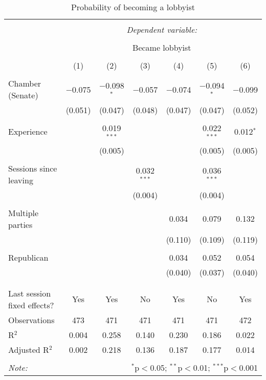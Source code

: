 \documentclass{article}
\begin{document}
  \begin{table}[!htbp] \centering 
    \caption{Probability of becoming a lobbyist} 
    \label{tab:lobbyist_basic} 
  \begin{tabular}{@{\extracolsep{5pt}}lcccccc} 
  \\[-1.8ex]\hline 
  \hline \\[-1.8ex] 
   & \multicolumn{6}{c}{\textit{Dependent variable:}} \\ 
  \cline{2-7} 
  \\[-1.8ex] & \multicolumn{6}{c}{Became lobbyist} \\ 
  \\[-1.8ex] & (1) & (2) & (3) & (4) & (5) & (6)\\ 
  \hline \\[-1.8ex] 
    Chamber (Senate) & $-$0.075 & $-$0.098$^{*}$ & $-$0.057 & $-$0.074 & $-$0.094$^{*}$ & $-$0.099 \\ 
    & (0.051) & (0.047) & (0.048) & (0.047) & (0.047) & (0.052) \\ 
    & & & & & & \\ 
   Experience &  & 0.019$^{***}$ &  &  & 0.022$^{***}$ & 0.012$^{*}$ \\ 
    &  & (0.005) &  &  & (0.005) & (0.005) \\ 
    & & & & & & \\ 
    Sessions since leaving &  &  & 0.032$^{***}$ &  & 0.036$^{***}$ &  \\ 
    &  &  & (0.004) &  & (0.004) &  \\ 
    & & & & & & \\ 
   Multiple parties &  &  &  & 0.034 & 0.079 & 0.132 \\ 
    &  &  &  & (0.110) & (0.109) & (0.119) \\ 
    & & & & & & \\ 
   Republican &  &  &  & 0.034 & 0.052 & 0.054 \\ 
    &  &  &  & (0.040) & (0.037) & (0.040) \\ 
    & & & & & & \\ 
  \hline \\[-1.8ex] 
  Last session fixed effects? & Yes & Yes & No & Yes & No & Yes \\ 
  Observations & 473 & 471 & 471 & 471 & 471 & 472 \\ 
  R$^{2}$ & 0.004 & 0.258 & 0.140 & 0.230 & 0.186 & 0.022 \\ 
  Adjusted R$^{2}$ & 0.002 & 0.218 & 0.136 & 0.187 & 0.177 & 0.014 \\ 
  \hline 
  \hline \\[-1.8ex] 
  \textit{Note:}  & \multicolumn{6}{r}{$^{*}$p$<$0.05; $^{**}$p$<$0.01; $^{***}$p$<$0.001} \\ 
  \end{tabular} 
  \end{table} 
\end{document}
